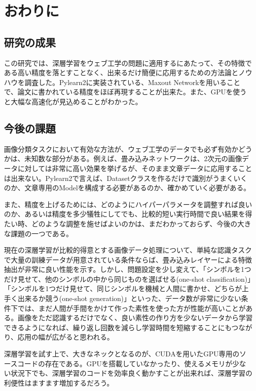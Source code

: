 \chapter{おわりに}
\section{研究の成果}
この研究では、深層学習をウェブ工学の問題に適用するにあたって、その特徴である高い精度を落とすことなく、出来るだけ簡便に応用するための方法論とノウハウを調査した。Pylearn2に実装されている、Maxout Networkを用いることで、論文に書かれている精度をほぼ再現することが出来た。また、GPUを使うと大幅な高速化が見込めることがわかった。

\section{今後の課題}
画像分類タスクにおいて有効な方法が、ウェブ工学のデータでも必ず有効かどうかは、未知数な部分がある。例えば、畳み込みネットワークは、2次元の画像データに対しては非常に高い効果を挙げるが、そのまま文章データに応用することは出来ない。Pylearn2で言えば、Datasetクラスを作るだけで識別がうまくいくのか、文章専用のModelを構成する必要があるのか、確かめていく必要がある。\par
また、精度を上げるためには、どのようにハイパーパラメータを調整すれば良いのか、あるいは精度を多少犠牲にしてでも、比較的短い実行時間で良い結果を得たい時、どのような調整を施せばよいのかは、まだわかっておらず、今後の大きな課題の一つである。\par
現在の深層学習が比較的得意とする画像データ処理について、単純な認識タスクで大量の訓練データが用意されている条件ならば、畳み込みレイヤーによる特徴抽出が非常に良い性能を示す。しかし、問題設定を少し変えて、「シンボルを1つだけ見せて、他のシンボルの中から同じものを選ばせる(one-shot classification)」「シンボルを1つだけ見せて、同じシンボルを機械と人間に書かせ、どちらが上手く出来るか競う(one-shot generation)」といった、データ数が非常に少ない条件下では、まだ人間が手間をかけて作った素性を使った方が性能が高いことがある\cite{lake2013one-shot}。画像をただ認識するだけでなく、良い素性の作り方を少ないデータから学習できるようになれば、繰り返し回数を減らし学習時間を短縮することにもつながり、応用の幅が広がると思われる。\par
深層学習を試す上で、大きなネックとなるのが、CUDAを用いたGPU専用のソースコードの存在である。GPUを搭載していなかったり、使えるメモリが少ない状況下でも、深層学習のコードを効率良く動かすことが出来れば、深層学習の利便性はますます増加するだろう。\par
